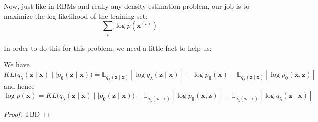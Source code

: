 \documentclass{article}
\begin{document}
    Now, just like in RBMs and really any density estimation problem, our job is to maximize the log likelihood of the training set: 
    \[\sum_{t} \log p(\mathbf{x}^{(t)})\]

    In order to do this for this problem, we need a little fact to help us: 

    \begin{theorem}
    We have 
    \[KL \big( q_\lambda (\mathbf{z} \mid \mathbf{x}) \mid\mid p_{\boldsymbol{\theta}} (\mathbf{z} \mid \mathbf{x}) \big) = \mathbb{E}_{q_\lambda(\mathbf{z} \mid \mathbf{x})} [ \log q_{\lambda} (\mathbf{z} \mid \mathbf{x})] + \log p_{\boldsymbol{\theta}} (\mathbf{x}) - \mathbb{E}_{q_{\lambda} (\mathbf{z} \mid \mathbf{x})} [\log p_{\boldsymbol{\theta}} (\mathbf{x}, \mathbf{z})] \]
    and hence 
    \[\log p(\mathbf{x}) = KL \big( q_\lambda (\mathbf{z} \mid \mathbf{x}) \mid\mid p_{\boldsymbol{\theta}} (\mathbf{z} \mid \mathbf{x}) \big) + \mathbb{E}_{q_{\lambda} (\mathbf{z} \mid \mathbf{x})} [\log p_{\boldsymbol{\theta}} (\mathbf{x}, \mathbf{z})] - \mathbb{E}_{q_\lambda(\mathbf{z} \mid \mathbf{x})} [ \log q_{\lambda} (\mathbf{z} \mid \mathbf{x})]  \]
    \end{theorem}
    \begin{proof}
    TBD 
    \end{proof}
\end{document}
